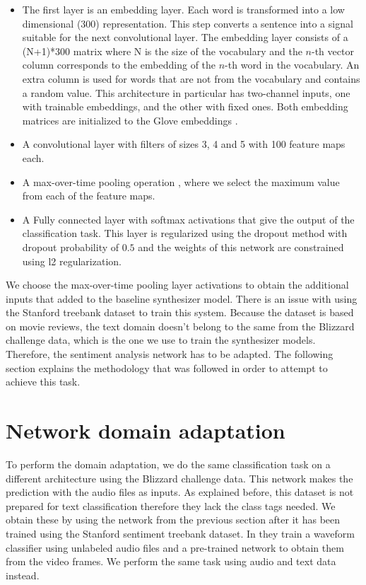 
\begin{itemize}
    \item The first layer is an embedding layer. Each word is transformed into a low dimensional (300) representation. This step converts a sentence into a signal suitable for the next convolutional layer. The embedding layer consists of a (N+1)*300 matrix where N is the size of the vocabulary and the $n$-th vector column corresponds to the embedding of the $n$-th word in the vocabulary. An extra column is used for words that are not from the vocabulary and contains a random value. This architecture in particular has two-channel inputs, one with trainable embeddings, and the other with fixed ones. Both embedding matrices are initialized to the Glove embeddings \cite{pennington2014glove}.
    \item A convolutional layer with filters of sizes 3, 4 and 5 with 100 feature maps each. 
    \item A max-over-time pooling operation \cite{collobert2011natural}, where we select the maximum value from each of the feature maps.
    \item A Fully connected layer with softmax activations that give the output of the classification task. This layer is regularized using the dropout method with dropout probability of $0.5$ \cite{srivastava2014dropout} and the weights of this network are constrained using l2 regularization.
\end{itemize}

We choose the max-over-time pooling layer activations to obtain the additional inputs that added to the baseline synthesizer model. There is an issue with using the Stanford treebank dataset to train this system. Because the dataset is based on movie reviews, the text domain doesn't belong to the same from the Blizzard challenge data, which is the one we use to train the synthesizer models. Therefore, the sentiment analysis network has to be adapted. The following section explains the methodology that was followed in order to attempt to achieve this task.

\section{Network domain adaptation}

To perform the domain adaptation, we do the same classification task on a different architecture using the Blizzard challenge data. This network makes the prediction with the audio files as inputs. As explained before, this dataset is not prepared for text classification therefore they lack the class tags needed. We obtain these by using the network from the previous section after it has been trained using the Stanford sentiment treebank dataset. In \cite{aytar2016soundnet} they train a waveform classifier using unlabeled audio files and a pre-trained network to obtain them from the video frames. We perform the same task using audio and text data instead.

